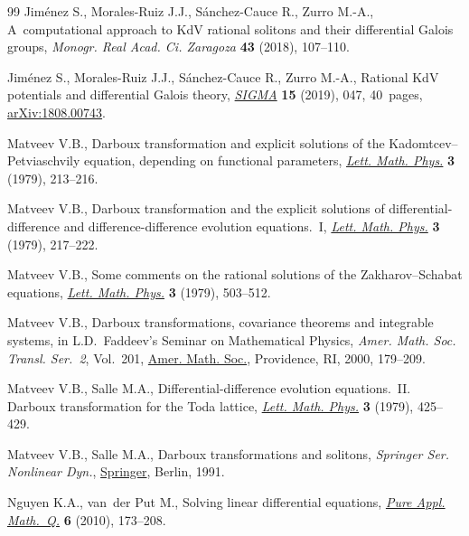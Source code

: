 \begin{thebibliography}{99}
Jim\'enez S., Morales-Ruiz J.J., S\'anchez-Cauce R., Zurro M.-A., A~computational approach to {K}d{V} rational solitons and their differential
 {G}alois groups, \textit{Monogr. Real Acad. Ci. Zaragoza} \textbf{43} (2018),
 107--110.

Jim\'enez S., Morales-Ruiz J.J., S\'anchez-Cauce R., Zurro M.-A., Rational
 {K}d{V} potentials and differential {G}alois theory, \href{https://doi.org/10.3842/SIGMA.2019.047}{\textit{SIGMA}}
 \textbf{15} (2019), 047, 40~pages, \href{https://arxiv.org/abs/1808.00743}{arXiv:1808.00743}.

Matveev V.B., Darboux transformation and explicit solutions of the
 {K}adomtcev--{P}etviaschvily equation, depending on functional parameters,
 \href{https://doi.org/10.1007/BF00405295}{\textit{Lett. Math. Phys.}} \textbf{3} (1979), 213--216.

Matveev V.B., Darboux transformation and the explicit solutions of
 differential-difference and difference-difference evolution equations.~{I},
 \href{https://doi.org/10.1007/BF00405296}{\textit{Lett. Math. Phys.}} \textbf{3} (1979), 217--222.

Matveev V.B., Some comments on the rational solutions of the
 {Z}akharov--{S}chabat equations, \href{https://doi.org/10.1007/BF00401932}{\textit{Lett. Math. Phys.}} \textbf{3}
 (1979), 503--512.

Matveev V.B., Darboux transformations, covariance theorems and integrable
 systems, in L.{D}.~{F}addeev's {S}eminar on {M}athematical {P}hysics,
 \textit{Amer. Math. Soc. Transl. Ser.~2}, Vol.~201, \href{https://doi.org/10.1090/trans2/201/11}{Amer. Math. Soc.},
 Providence, RI, 2000, 179--209.

Matveev V.B., Salle M.A., Differential-difference evolution equations.~{II}.
 {D}arboux transformation for the {T}oda lattice, \href{https://doi.org/10.1007/BF00397217}{\textit{Lett. Math. Phys.}}
 \textbf{3} (1979), 425--429.

Matveev V.B., Salle M.A., Darboux transformations and solitons, \textit{Springer Ser.
 Nonlinear Dyn.}, \href{https://doi.org/10.1007/978-3-662-00922-2}{Springer}, Berlin, 1991.

Nguyen K.A., van~der Put M., Solving linear differential equations,
 \href{https://doi.org/10.4310/PAMQ.2010.v6.n1.a5}{\textit{Pure Appl. Math.~Q.}} \textbf{6} (2010), 173--208.


\end{thebibliography}
